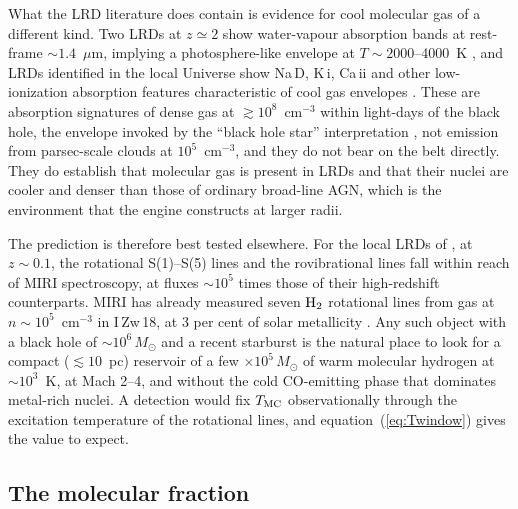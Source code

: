 \documentclass[twocolumn,pdftex]{aastex701}
\newcommand{\msun}{M_{\odot}}
\newcommand{\Htwo}{{\rm H_2}}
\begin{document}
What the LRD literature does contain is evidence for cool molecular gas of a different kind. Two LRDs at $z\simeq2$ show water-vapour absorption bands at rest-frame $\sim1.4$~$\mu$m, implying a photosphere-like envelope at $T\sim2000$--4000~K \citep{Wang:2026a}, and LRDs identified in the local Universe show Na\,D, K\,{\sc i}, Ca\,{\sc ii} and other low-ionization absorption features characteristic of cool gas envelopes \citep{Lin:2026a}. These are absorption signatures of dense gas at $\gtrsim10^{8}$~cm$^{-3}$ within light-days of the black hole, the envelope invoked by the ``black hole star'' interpretation \citep{Naidu:2025a}, not emission from parsec-scale clouds at $10^{5}$~cm$^{-3}$, and they do not bear on the belt directly. They do establish that molecular gas is present in LRDs and that their nuclei are cooler and denser than those of ordinary broad-line AGN, which is the environment that the engine constructs at larger radii.

The prediction is therefore best tested elsewhere. For the local LRDs of \citet{Lin:2026a}, at $z\sim0.1$, the rotational S(1)--S(5) lines and the rovibrational lines fall within reach of MIRI spectroscopy, at fluxes $\sim10^{5}$ times those of their high-redshift counterparts. MIRI has already measured seven $\Htwo$ rotational lines from gas at $n\sim10^{5}$~cm$^{-3}$ in I\,Zw\,18, at 3 per cent of solar metallicity \citep{Hunt:2025a}. Any such object with a black hole of $\sim10^{6}\,\msun$ and a recent starburst is the natural place to look for a compact ($\lesssim10$~pc) reservoir of a few $\times10^{5}\,\msun$ of warm molecular hydrogen at $\sim10^{3}$~K, at Mach 2--4, and without the cold CO-emitting phase that dominates metal-rich nuclei. A detection would fix $T_{\rm MC}$ observationally through the excitation temperature of the rotational lines, and equation~(\ref{eq:Twindow}) gives the value to expect.

\subsection{The molecular fraction}\label{sec:xh2}
\end{document}
